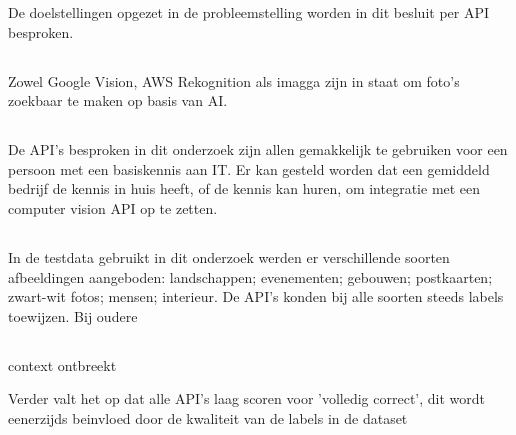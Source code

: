 De doelstellingen opgezet in de probleemstelling worden in dit besluit per API besproken.

\subsection{}
\label{sec:resultaten-doelstelling1}
Zowel Google Vision, AWS Rekognition als imagga zijn in staat om foto's zoekbaar te maken op basis van AI.

\subsection{}
\label{sec:resultaten-doelstelling2}
De API's besproken in dit onderzoek zijn allen gemakkelijk te gebruiken voor een persoon met een basiskennis aan IT. Er kan gesteld worden dat een gemiddeld bedrijf de kennis in huis heeft, of de kennis kan huren, om integratie met een computer vision API op te zetten.

\subsection{}
\label{sec:resultaten-doelstelling3}
In de testdata gebruikt in dit onderzoek werden er verschillende soorten afbeeldingen aangeboden: landschappen; evenementen; gebouwen; postkaarten; zwart-wit fotos; mensen; interieur. De API's konden bij alle soorten steeds labels toewijzen. Bij oudere

\subsection{}
\label{sec:resultaten-doelstelling4}

\subsection{}
\label{sec:resultaten-besluit}
context ontbreekt

Verder valt het op dat alle API's laag scoren voor 'volledig correct', dit wordt eenerzijds beinvloed door de kwaliteit van de labels in de dataset